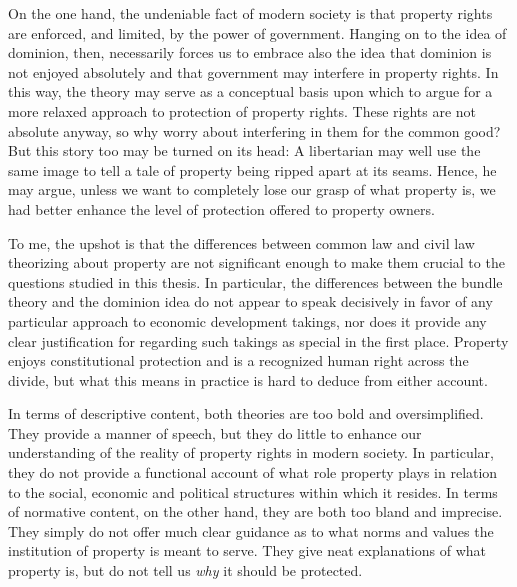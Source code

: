 \documentclass[12pt,a4paper]{book} %
\begin{document}
On the one hand, the undeniable fact of modern society is that property rights are enforced, and limited, by the power of government. Hanging on to the idea of dominion, then, necessarily forces us to embrace also the idea that dominion is not enjoyed absolutely and that government may interfere in property rights. In this way, the theory may serve as a conceptual basis upon which to argue for a more relaxed approach to protection of property rights. These rights are not absolute anyway, so why worry about interfering in them for the common good? But this story too may be turned on its head: A libertarian may well use the same image to tell a tale of property being ripped apart at its seams. Hence, he may argue, unless we want to completely lose our grasp of what property is, we had better enhance the level of protection offered to property owners.

To me, the upshot is that the differences between common law and civil law theorizing about property are not significant enough to 
make them crucial to the questions studied in this thesis. In particular, the differences between the bundle theory and the dominion idea do not appear to speak decisively in favor of any particular approach to economic development takings, nor does it provide any clear justification for regarding such takings as special in the first place. Property enjoys constitutional protection and is a recognized human right across the divide, but what this means in practice is hard to deduce from either account.

In terms of descriptive content, both theories are too bold and oversimplified. They provide a manner of speech, but they do little to enhance our understanding of the reality of property rights in modern society. In particular, they do not provide a functional account of what role property plays in relation to the social, economic and political structures within which it resides. In terms of normative content, on the other hand, they are both too bland and imprecise. They simply do not offer much clear guidance as to what norms and values the institution of property is meant to serve. They give neat explanations of what property is, but do not tell us {\it why} it should be protected. 
\end{document}
